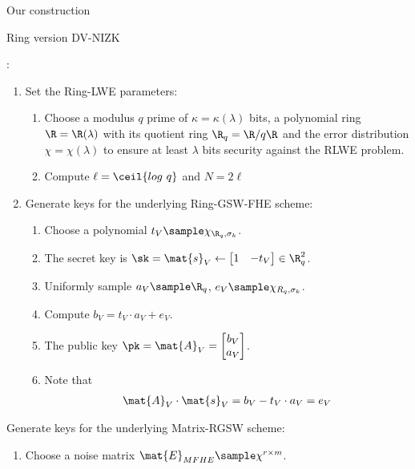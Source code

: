 \begin{section}{Our construction}
  \begin{subsection}{Ring version DV-NIZK}
    \begin{description}
    \item[$\KeyGen(1^\lambda)$]:
      \begin{enumerate}
      \item Set the Ring-LWE parameters:
        \begin{enumerate}
        \item Choose a modulus $q$ prime of $\kappa=\kappa(\lambda)$ bits, a polynomial ring $\R = \R(\lambda)$ with its quotient ring $\R_q = \R/q\R$ and the error distribution $\chi = \chi(\lambda)$ to  ensure at least $\lambda$ bits security against the RLWE problem.
        \item Compute $\ell = \ceil{log~q}$ and $N = 2 \ell$
        \end{enumerate}
      \item Generate keys for the underlying Ring-GSW-FHE scheme:
        \begin{enumerate}
        \item Choose a polynomial $t_V \sample \chi_{\R_q, \sigma_k}$.
        \item The secret key is $\sk = \mat{s}_V \gets \begin{bmatrix}1 & -t_V\end{bmatrix} \in \R_q^2$.
        \item Uniformly sample $a_V \sample \R_q$, $e_V \sample \chi_{R_q, \sigma_k}$.
        \item Compute $b_V = t_V \cdot a_V + e_V$.
        \item The public key $\pk = \mat{A}_V = \begin{bmatrix} b_V \\ a_V\end{bmatrix}$.
        \item Note that
          \begin{align*}
            \mat{A}_V \cdot \mat{s}_V = b_V - t_V \cdot a_V = e_V
          \end{align*}
        \end{enumerate}
      \end{enumerate}
      \item Generate keys for the underlying Matrix-RGSW scheme:
        \begin{enumerate}
        \item Choose a noise matrix $\mat{E}_{MFHE} \sample \chi^{r \times m}$.

\end{enumerate}
\end{description}
\end{subsection}
\end{section}
